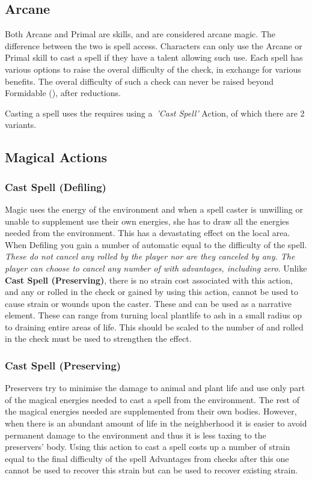 \begin{multicols}{2}
\section{Arcane}
Both Arcane and Primal are skills, and are considered arcane magic. The
difference between the two is spell access.  Characters can only use the
Arcane or Primal skill to cast a spell if they have a talent allowing
such use. Each spell has various options to raise the overal difficulty
of the check, in exchange for various benefits. The overal difficulty of
such a check can never be raised beyond Formidable
(\difficulty\difficulty\difficulty\difficulty), after reductions.

Casting a spell uses the requires using a~\textit{'Cast Spell'}
Action, of which there are 2 variants.

\subsection{Magical Actions}
\subsubsection{Cast Spell (Defiling)} \label{action:defliling}
Magic uses the energy of the environment and when a spell caster is unwilling or
unable to supplement use their own energies, she has to draw all the energies
needed from the environment. This has a devastating effect on the local area.
When Defiling you gain a number of automatic \threat equal to the difficulty of
the spell. \textit{These do not cancel any \advantage rolled by the player nor
are they canceled by any. The player can choose to cancel any number of \threat
with advantages, including zero}. Unlike \textbf{Cast Spell (Preserving)}, there is no strain cost
associated with this action, and any \threat or \despair rolled in the check
or gained by using this action, cannot be used to cause strain or wounds upon the
caster. These \threat and \despair can be used as a narrative element. These can
range from turning local plantlife to ash in a small radius op to draining entire
areas of life. This should be scaled to the number of \threat and \despair rolled
in the check must be used to strengthen the effect.

\subsubsection{Cast Spell (Preserving)} \label{action:preserving}
Preservers try to minimise the damage to animal and plant life and use
only part of the magical energies needed to cast a spell from the environment.
The rest of the magical energies needed are supplemented from their own bodies.
However, when there is an abundant amount of life in the neighberhood it is
easier to avoid permanent damage to the environment and thus it is less taxing
to the preservers' body.  Using this action to cast a spell costs up a number of
strain equal to the final difficulty of the spell Advantages from checks after
this one cannot be used to recover this strain but can be used to recover existing
strain.


\end{multicols}
